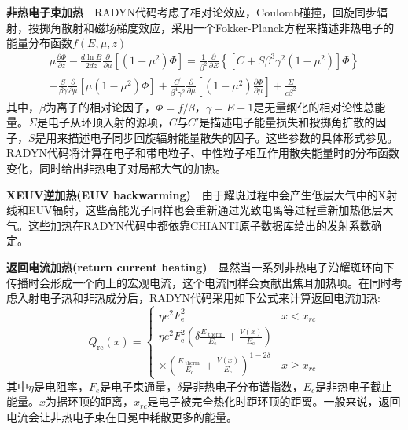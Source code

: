 \textbf{非热电子束加热}\ \ RADYN代码考虑了相对论效应，Coulomb碰撞，回旋同步辐射，投掷角散射和磁场梯度效应，采用一个Fokker-Planck方程来描述非热电子的能量分布函数$f(E,\mu,z)$\parencites{Allred2015}
\begin{multline}
	\mu \frac{\partial \Phi}{\partial z}-\frac{d \ln B}{2 d z} \frac{\partial}{\partial \mu}\left[\left(1-\mu^{2}\right) \Phi\right] =\frac{1}{\beta^{2}} \frac{\partial}{\partial E}\left\{\left[C+S \beta^{3} \gamma^{2}\left(1-\mu^{2}\right)\right] \Phi\right\} \\
	-\frac{S}{\beta \gamma} \frac{\partial}{\partial \mu}\left[\mu\left(1-\mu^{2}\right) \Phi\right] +\frac{C^{\prime}}{\beta^{4} \gamma^{2}} \frac{\partial}{\partial \mu}\left[\left(1-\mu^{2}\right) \frac{\partial \Phi}{\partial \mu}\right]+\frac{\Sigma}{c \beta^{2}}
\end{multline}
其中，$\beta$为离子的相对论因子，$\Phi = f/\beta $，$\gamma = E+1$是无量纲化的相对论性总能量。$\Sigma$是电子从环顶入射的源项，$C$与$C'$是描述电子能量损失和投掷角扩散的因子，$S$是用来描述电子同步回旋辐射能量散失的因子。这些参数的具体形式参见\textcites{Allred2015}。RADYN代码将计算在电子和带电粒子、中性粒子相互作用散失能量时的分布函数变化，同时给出非热电子对局部大气的加热。

\textbf{XEUV逆加热(EUV backwarming)}\ \ 由于耀斑过程中会产生低层大气中的X射线和EUV辐射，这些高能光子同样也会重新通过光致电离等过程重新加热低层大气。这些加热在RADYN代码中都依靠CHIANTI原子数据库给出的发射系数确定。

\textbf{返回电流加热(return current heating)}\ \ 显然当一系列非热电子沿耀斑环向下传播时会形成一个向上的宏观电流，这个电流同样会贡献出焦耳加热项。在同时考虑入射电子热和非热成分后，RADYN代码采用如下公式来计算返回电流加热\parencites{Allred2015}:
\begin{equation}
	Q_{\mathrm{rc}}(x)=\begin{cases}\eta e^{2} F_{\mathrm{e}}^{2} & x<x_{rc} \\ {\eta e^{2} F_{\mathrm{e}}^{2}\left(\delta \frac{E_{\text { therm }}}{E_{\mathrm{c}}}+\frac{V(x)}{E_{\mathrm{c}}}\right)} \\ { \times\left(\frac{E_{\text { therm }}}{E_{\mathrm{c}}}+\frac{V(x)}{E_{\mathrm{c}}}\right)^{1-2 \delta}} &x\geq x_{rc} \end{cases} 
\end{equation}
其中$\eta$是电阻率，$F_e$是电子束通量，$\delta$是非热电子分布谱指数，$E_c$是非热电子截止能量。$x$为据环顶的距离，$x_{rc}$是电子被完全热化时距环顶的距离。一般来说，返回电流会让非热电子束在日冕中耗散更多的能量。
